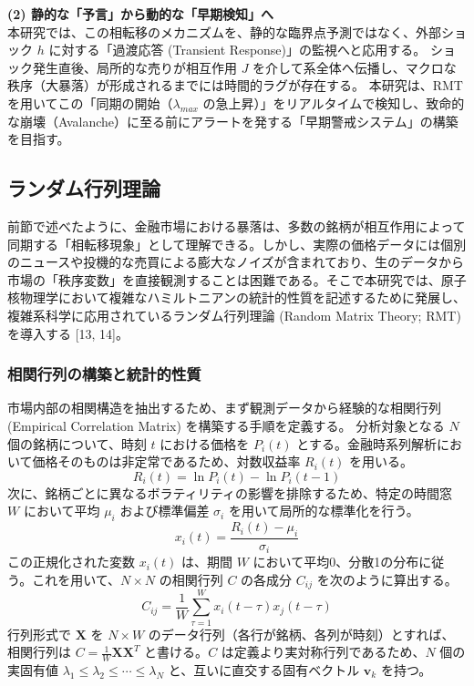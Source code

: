 \documentclass[11pt,a4paper,oneside]{ltjsarticle}
\begin{document}
\textbf{(2) 静的な「予言」から動的な「早期検知」へ} \\
本研究では、この相転移のメカニズムを、静的な臨界点予測ではなく、外部ショック $h$ に対する「過渡応答 (Transient Response)」の監視へと応用する。
ショック発生直後、局所的な売りが相互作用 $J$ を介して系全体へ伝播し、マクロな秩序（大暴落）が形成されるまでには時間的ラグが存在する。
本研究は、RMTを用いてこの「同期の開始（$\lambda_{max}$ の急上昇）」をリアルタイムで検知し、致命的な崩壊（Avalanche）に至る前にアラートを発する「早期警戒システム」の構築を目指す。

\subsection{ランダム行列理論}
前節で述べたように、金融市場における暴落は、多数の銘柄が相互作用によって同期する「相転移現象」として理解できる。しかし、実際の価格データには個別のニュースや投機的な売買による膨大なノイズが含まれており、生のデータから市場の「秩序変数」を直接観測することは困難である。そこで本研究では、原子核物理学において複雑なハミルトニアンの統計的性質を記述するために発展し、複雑系科学に応用されているランダム行列理論 (Random Matrix Theory; RMT) を導入する [13, 14]。

\subsubsection{相関行列の構築と統計的性質}
市場内部の相関構造を抽出するため、まず観測データから経験的な相関行列 (Empirical Correlation Matrix) を構築する手順を定義する。
分析対象となる $N$ 個の銘柄について、時刻 $t$ における価格を $P_{i}(t)$ とする。金融時系列解析において価格そのものは非定常であるため、対数収益率 $R_{i}(t)$ を用いる。
\begin{equation}
R_{i}(t) = \ln P_{i}(t) - \ln P_{i}(t-1)
\end{equation}
次に、銘柄ごとに異なるボラティリティの影響を排除するため、特定の時間窓 $W$ において平均 $\mu_{i}$ および標準偏差 $\sigma_{i}$ を用いて局所的な標準化を行う。
\begin{equation}
x_{i}(t) = \frac{R_{i}(t) - \mu_{i}}{\sigma_{i}}
\end{equation}
この正規化された変数 $x_{i}(t)$ は、期間 $W$ において平均0、分散1の分布に従う。これを用いて、$N \times N$ の相関行列 $C$ の各成分 $C_{ij}$ を次のように算出する。
\begin{equation}
C_{ij} = \frac{1}{W} \sum_{\tau=1}^{W} x_{i}(t-\tau) x_{j}(t-\tau)
\end{equation}
行列形式で $\mathbf{X}$ を $N \times W$ のデータ行列（各行が銘柄、各列が時刻）とすれば、相関行列は $C = \frac{1}{W} \mathbf{X}\mathbf{X}^{T}$ と書ける。$C$ は定義より実対称行列であるため、$N$ 個の実固有値 $\lambda_{1} \le \lambda_{2} \le \cdots \le \lambda_{N}$ と、互いに直交する固有ベクトル $\mathbf{v}_{k}$ を持つ。
\end{document}

